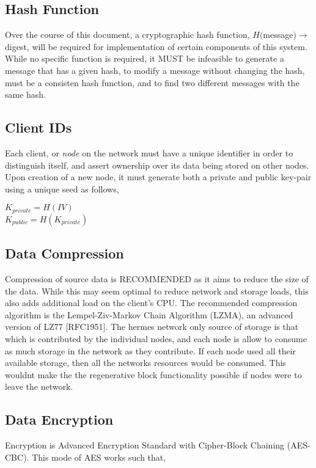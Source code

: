 \documentclass[journal]{IEEEtran}
\begin{document}
\subsection{Hash Function}
Over the course of this document, a cryptographic hash function, $H($message$) \rightarrow$ digest, will be required for implementation of certain components of this system. While no specific function is required, it MUST be infeasible to generate a message that has a given hash, to modify a message without changing the hash, must be a consisten hash function, and to find two different messages with the same hash.

\subsection{Client IDs}
Each client, or \textit{node} on the network must have a unique identifier in order to distinguish itself, and assert ownership over its data being stored on other nodes. Upon creation of a new node, it must generate both a private and public key-pair using a unique seed as follows,

\begin{center}
$K_{private} = H(IV)$\\
$K_{public} = H(K_{private})$
\end{center}



\subsection{Data Compression}
Compression of source data is RECOMMENDED as it aims to reduce the size of the data. While this may seem optimal to reduce network and storage loads, this also adds additional load on the client's CPU. The recommended compression algorithm is the Lempel-Ziv-Markov Chain Algorithm (LZMA), an advanced version of LZ77 [RFC1951]. The hermes network only source of storage is that which is contributed by the individual nodes, and each node is allow to consume as much storage in the network as they contribute. If each node used all their available storage, then all the networks resources would be consumed. This wouldnt make the the regenerative block functionality possible if nodes were to leave the network.

\subsection{Data Encryption} %
Encryption is Advanced Encryption Standard with Cipher-Block Chaining (AES-CBC). This mode of AES works such that,
\end{document}
